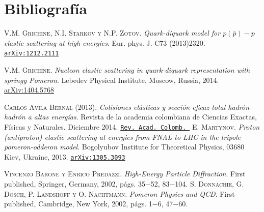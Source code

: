 \section*{Bibliograf\'ia}
\begin{thebibliography}{X}
  \textsc{V.M. Grichine, N.I. Starkov y N.P. Zotov.}
 \textit{Quark-diquark model for $p(\bar{p})-p$ elastic scattering at high
energies}. \textup{Eur. phys. J. C73 (2013)2320}.\\
 \href{http://lanl.arxiv.org/abs/1212.2111v2}{\texttt{arXiv:1212.2111}}

  \textsc{V.M. Grichine.}
 \textit{Nucleon elastic scattering in quark-diquark representation with
springy Pomeron}. \textup{Lebedev Physical Institute, Moscow, Russia, 2014}.\\
 \href{https://arxiv.org/abs/1404.5768v1}{arXiv:1404.5768}
 



 \textsc{Carlos Avila Bernal (2013).} \textit{Colisiones el\'asticas y secci\'on eficaz total hadr\'on-hadr\'on a altas energ\'ias}.
\textup{Revista de la academia colombiana de Ciencias Exactas, F\'isicas y Naturales. Diciembre 2014. }\href{https://www.raccefyn.co/index.php/raccefyn/article/viewFile/151/62}{\texttt{Rev. Acad. Colomb. }}
 \textsc{E. Martynov.}
 \textit{Proton (antiproton) elastic scattering at energies from FNAL to LHC
in the tripole pomeron-odderon model}. \textup{Bogolyubov Institute for Theoretical Physics, 03680 Kiev, Ukraine, 2013.} \href{https://arxiv.org/abs/1305.3093v1}{\texttt{arXiv:1305.3093}}

 \textsc{Vincenzo Barone \textup{y} Enrico Predazzi.} \textit{High-Energy Particle Diffraction}.
\textup{First published, Springer, Germany, 2002, p\'ags. 35$-$52, 83$-$104.}
 \textsc{S. Donnachie, G. Dosch, P. Landshoff y O. Nachtmann.} \textit{Pomeron Physics and QCD}.
\textup{First published, Cambridge, New York, 2002, p\'ags. 1$-$6, 47$-$60.}



 
\end{thebibliography}










